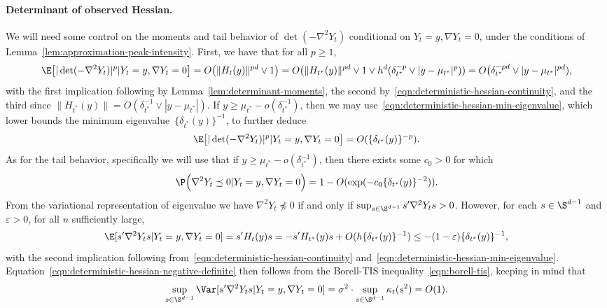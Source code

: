 \documentclass{article}
\begin{document}
	\paragraph{Determinant of observed Hessian.}
	We will need some control on the moments and tail behavior of $\det(-\nabla^2 Y_{t})$ conditional on $Y_{t} = y, \nabla Y_{t} = 0$, under the conditions of Lemma~\ref{lem:approximation-peak-intensity}. First, we have that for all $p \geq 1$, 
	\begin{equation}
		\label{eqn:deterministic-hessian-determinant-moments}
		\E\big[|\det(-\nabla^2 Y_t)|^p|Y_t = y,\nabla Y_t = 0\big] = O\big(\|H_t(y)\|^{pd} \vee 1\big) = O\big(\|H_{t^*}(y)\|^{pd} \vee 1 \vee h^{d}(\delta_{t^*}^{-p} \vee |y - \mu_{t^*}|^p)) = O\big(\delta_{t^*}^{-pd} \vee |y - \mu_{t^*}|^{pd}),
	\end{equation}
	with the first implication following by Lemma~\ref{lem:determinant-moments}, the second by~\eqref{eqn:deterministic-hessian-continuity}, and the third since $\|H_{t^*}(y)\| = O(\delta_{t^*}^{-1} \vee |y - \mu_{t^*}|)$. If $y \geq \mu_{t^*} - o(\delta_{t^*}^{-1})$, then we may use~\eqref{eqn:deterministic-hessian-min-eigenvalue}, which lower bounds the minimum eigenvalue~$\{\delta_{t^*}(y)\}^{-1}$, to further deduce
	\begin{equation*}
		\label{eqn:deterministic-hessian-determinant-moments-2}
		\E\big[|\det(-\nabla^2 Y_t)|^p|Y_t = y,\nabla Y_t = 0\big] = O(\{\delta_{t^*}(y)\}^{-p}).
	\end{equation*}
	As for the tail behavior, specifically we will use that if $y \geq \mu_{t^*} - o(\delta_{t^*}^{-1})$, then there exists some $c_0 > 0$ for which
	\begin{equation}
		\label{eqn:deterministic-hessian-negative-definite}
		\P\Big(\nabla^2 Y_t \preceq 0|Y_t = y,\nabla Y_t = 0\Big) = 1 - O(\exp(-c_0\{\delta_{t^*}(y)\}^{-2})).
	\end{equation}
	From the variational representation of eigenvalue we have $\nabla^2 Y_t \not\preceq 0$ if and only if $\sup_{s \in \S^{d - 1}} s'\nabla^2 Y_ts > 0$. However, for each $s \in \S^{d - 1}$ and $\varepsilon > 0$, for all $n$ sufficiently large,
	\begin{equation}
		\E[s'\nabla^2 Y_t s|Y_t = y,\nabla Y_t = 0] = s'H_t(y)s = -s' H_{t^*}(y)s + O(h\{\delta_{t^*}(y)\}^{-1}) \leq -(1 - \varepsilon)\{\delta_{t^*}(y)\}^{-1},
	\end{equation}
	with the second implication following from~\eqref{eqn:deterministic-hessian-continuity} and~\eqref{eqn:deterministic-hessian-min-eigenvalue}. Equation~\eqref{eqn:deterministic-hessian-negative-definite} then follows from the Borell-TIS inequality~\eqref{eqn:borell-tis}, keeping in mind that 
	$$
	\sup_{s \in \S^{d - 1}} \Var[s'\nabla^2 Y_t s|Y_t = y,\nabla Y_t = 0] = \sigma^2 \cdot \sup_{s \in \S^{d - 1}}\kappa_{t}(s^2) = O(1).
	$$
	
\end{document}

